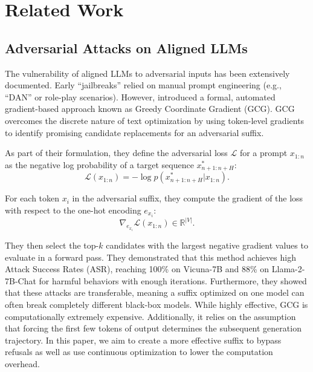 \documentclass[letterpaper]{article} %
\begin{document}
\section{Related Work}
\label{gen_inst}
\subsection{Adversarial Attacks on Aligned LLMs}
The vulnerability of aligned LLMs to adversarial inputs has been extensively documented. Early ``jailbreaks'' relied on manual prompt engineering (e.g., ``DAN'' or role-play scenarios)\citep{shen2023do}. However, \cite{zou2023universal} introduced a formal, automated gradient-based approach known as Greedy Coordinate Gradient (GCG). GCG overcomes the discrete nature of text optimization by using token-level gradients to identify promising candidate replacements for an adversarial suffix. 

As part of their formulation, they define the adversarial loss $\mathcal{L}$ for a prompt $x_{1:n}$ as the negative log probability of a target sequence $x^*_{n+1:n+H}$:
\begin{equation}
    \mathcal{L}(x_{1:n}) = - \log p(x^*_{n+1:n+H} | x_{1:n}).
\end{equation}

For each token $x_i$ in the adversarial suffix, they compute the gradient of the loss with respect to the one-hot encoding $e_{x_i}$:
\begin{equation}
    \nabla_{e_{x_i}} \mathcal{L}(x_{1:n}) \in \mathbb{R}^{|V|}.
\end{equation}

They then select the top-$k$ candidates with the largest negative gradient values to evaluate in a forward pass. They demonstrated that this method achieves high Attack Success Rates (ASR), reaching 100\% on Vicuna-7B and 88\% on Llama-2-7B-Chat for harmful behaviors with enough iterations. Furthermore, they showed that these attacks are transferable, meaning a suffix optimized on one model can often break completely different black-box models. While highly effective, GCG is computationally extremely expensive. Additionally, it relies on the assumption that forcing the first few tokens of output determines the subsequent generation trajectory. In this paper, we aim to create a more effective suffix to bypass refusals as well as use continuous optimization to lower the computation overhead. 
\end{document}
